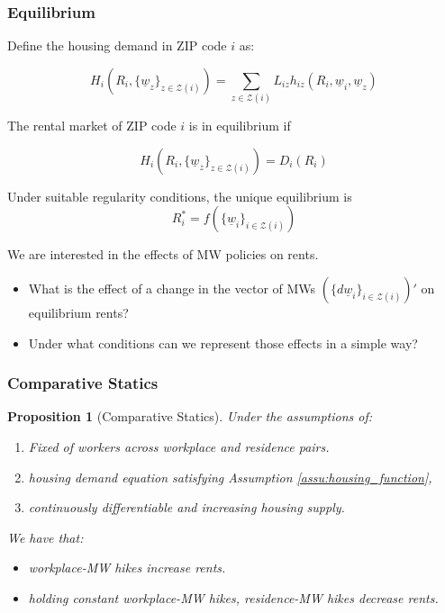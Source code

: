 \documentclass[aspectratio=169, t]{beamer}
\newtheorem{prop}{Proposition}
\newcommand{\Z}{\mathcal{Z}}
\newcommand{\MW}{\underline{w}}
\begin{document}
\begin{frame}
	\frametitle{Equilibrium}
	
	Define the housing demand in ZIP code $i$ as:
	
	 \[
	 H_{i} (R_i, \{\MW_z\}_{z\in\Z(i)}) = \sum_{z\in\Z(i)} L_{iz} h_{iz} (R_i, \MW_i, \MW_z)
	 \]
	
	The rental market of ZIP code $i$ is in equilibrium if
	
	$$ H_{i} (R_i, \{\MW_z\}_{z\in\Z(i)}) = D_i(R_i) $$
	
    Under suitable regularity conditions, the unique equilibrium is 
	$$R^*_i = f(\{\MW_i\}_{i\in\Z(i)})$$
	
	\vspace{4mm}
	\pause
	We are interested in the effects of MW policies on rents.
	\vspace{1mm}
	\begin{itemize} \small
		\item What is the effect of a change in the vector of MWs 
		$(\{d \MW_i\}_{i\in\Z(i)})'$ on equilibrium rents?
		\item Under what conditions can we represent those effects in a simple way?
	\end{itemize}
\end{frame}

\begin{frame}[label = prop_comp_stat]
    \frametitle{Comparative Statics}
    
    \begin{prop}[Comparative Statics]\label{prop:comparative_statics}
        Under the assumptions of:
        \begin{enumerate}
           \item Fixed of workers across workplace and residence pairs.
            \item housing demand equation satisfying Assumption \ref{assu:housing_function}, 
            \item continuously differentiable and increasing housing supply.
        \end{enumerate} 
        We have that:
        \begin{itemize}
            \item workplace-MW hikes increase rents.
            \item holding constant workplace-MW hikes, residence-MW hikes decrease rents.
        \end{itemize}
    \end{prop}
\end{frame}
\end{document}
